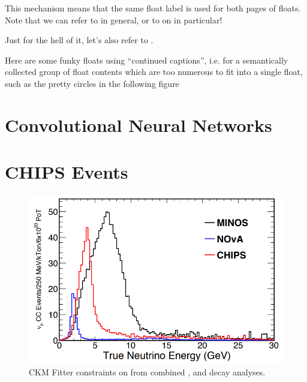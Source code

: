 \noindent
This mechanism means that the same float label is used for both pages of
floats. Note that we can refer to  in general, or to
 on  in particular!

\noindent
Just for the hell of it, let's also refer to .

Here are some funky floats using ``continued captions'', i.e. for a semantically
collected group of float contents which are too numerous to fit into a single
float, such as the pretty circles in the following figure

\section{Convolutional Neural Networks}
\label{sec:cnn}

\section{CHIPS Events}
\label{sec:events}

\begin{figure}
    \includegraphics[width=\largefigwidth]{diagrams/numi_axis}
    \caption[CKM Fitter constraints on \alphaCKM.]%
    {CKM Fitter constraints on \alphaCKM from combined \BToPiPi,
        \BToRhoPi and \BToRhoRho decay analyses.}
    \label{fig:numi_axis}
\end{figure}

